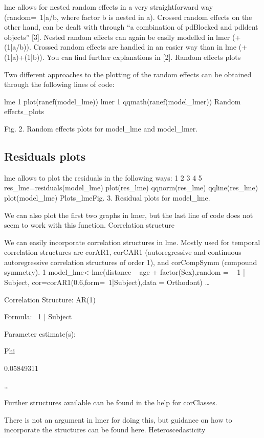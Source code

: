 \begin{itemize}
lme allows for nested random effects in a very straightforward way (random=~1|a/b, where factor b is nested in a). Crossed random effects on the other hand, can be dealt with through “a combination of pdBlocked and pdldent objects” [3].
Nested random effects can again be easily modelled in lmer (+(1|a/b)). Crossed random effects are handled in an easier way than in lme (+(1|a)+(1|b)). You can find further explanations in [2].
Random effects plots

Two different approaches to the plotting of the random effects can be obtained through the following lines of code:

lme
1
plot(ranef(model_lme))
lmer
1
qqmath(ranef(model_lmer))
Random effects_plots

Fig. 2. Random effects plots for model_lme and model_lmer.



\subsection*{Residuals plots}

lme allows to plot the residuals in the following ways:
1
2
3
4
5
res_lme=residuals(model_lme)
plot(res_lme)
qqnorm(res_lme)
qqline(res_lme)
plot(model_lme)
Plots_lmeFig. 3. Residual plots for model_lme.

We can also plot the first two graphs in lmer, but the last line of code does not seem to work with this function.
Correlation structure

We can easily incorporate correlation structures in lme.  Mostly used for temporal correlation structures are corAR1, corCAR1 (autoregressive and continuous autoregressive correlation structures of order 1), and corCompSymm (compound symmetry).
1
model_lme<-lme(distance ~ age + factor(Sex),random = ~ 1 | Subject, cor=corAR1(0.6,form=~1|Subject),data = Orthodont)
…

Correlation Structure: AR(1)

Formula: ~1 | Subject

Parameter estimate(s):

Phi

0.05849311

…

Further structures available can be found in the help for corClasses.

There is not an argument in lmer for doing this, but guidance on how to incorporate the structures can be found here.
Heteroscedasticity


\end{itemize}
